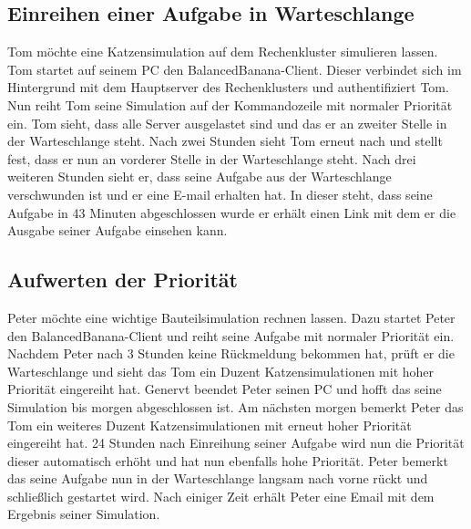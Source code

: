 \documentclass[a4paper,12pt]{article}
\begin{document}
\subsection{\textbf{Einreihen einer Aufgabe in Warteschlange}}
Tom möchte eine Katzensimulation auf dem Rechenkluster simulieren lassen. %
Tom startet auf seinem PC den BalancedBanana-Client. Dieser verbindet sich im Hintergrund mit dem Hauptserver des Rechenklusters und authentifiziert Tom.
Nun reiht Tom seine Simulation auf der Kommandozeile mit normaler Priorität ein.
Tom sieht, dass alle Server ausgelastet sind und das er an zweiter Stelle in der Warteschlange steht.
Nach zwei Stunden sieht Tom erneut nach und stellt fest, dass er nun an vorderer Stelle in der Warteschlange steht.
Nach drei weiteren Stunden sieht er, dass seine Aufgabe aus der Warteschlange verschwunden ist und er eine E-mail erhalten hat.
In dieser steht, dass seine Aufgabe in 43 Minuten abgeschlossen wurde er erhält einen Link mit dem er die Ausgabe seiner Aufgabe einsehen kann.

\subsection{\textbf{Aufwerten der Priorität}}
Peter möchte eine wichtige Bauteilsimulation rechnen lassen.
Dazu startet Peter den BalancedBanana-Client und reiht seine Aufgabe mit normaler Priorität ein.
Nachdem Peter nach 3 Stunden keine Rückmeldung bekommen hat, prüft er die Warteschlange und sieht das Tom ein Duzent Katzensimulationen mit hoher Priorität eingereiht hat.
Genervt beendet Peter seinen PC und hofft das seine Simulation bis morgen abgeschlossen ist.
Am nächsten morgen bemerkt Peter das Tom ein weiteres Duzent Katzensimulationen mit erneut hoher Priorität eingereiht hat.
24 Stunden nach Einreihung seiner Aufgabe wird nun die Priorität dieser automatisch erhöht und hat nun ebenfalls hohe Priorität.
Peter bemerkt das seine Aufgabe nun in der Warteschlange langsam nach vorne rückt und schließlich gestartet wird. 
Nach einiger Zeit erhält Peter eine Email mit dem Ergebnis seiner Simulation.

\clearpage
\end{document}
